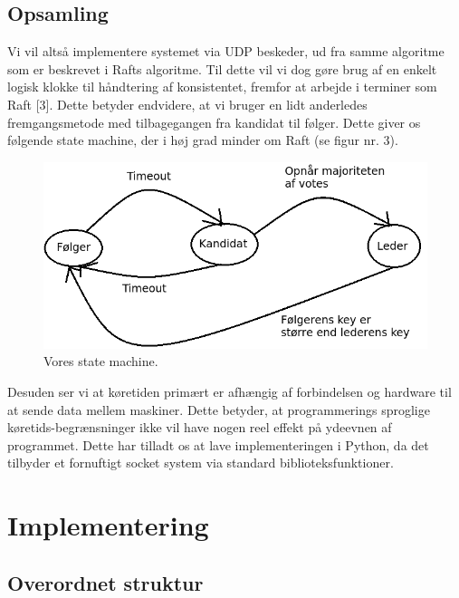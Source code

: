 \documentclass[a4paper,12pt]{article}
\begin{document}
\subsection{Opsamling}
Vi vil altså implementere systemet via UDP beskeder, ud fra samme algoritme som er beskrevet i Rafts algoritme. Til dette vil vi dog gøre brug af en enkelt logisk klokke til håndtering af konsistentet, fremfor at arbejde i terminer som Raft [3]. Dette betyder endvidere, at vi bruger en lidt anderledes fremgangsmetode med tilbagegangen fra kandidat til følger. Dette giver os følgende state machine, der i høj grad minder om Raft (se figur nr. 3).
\begin{figure}[H]
  \caption{Vores state machine.}
  \centering
    \includegraphics[width=1\textwidth]{State-machine.png}
\end{figure}

Desuden ser vi at køretiden primært er afhængig af forbindelsen og hardware til at sende data mellem maskiner. Dette betyder, at programmerings sproglige køretids-begrænsninger ikke vil have nogen reel effekt på ydeevnen af programmet. Dette har tilladt os at lave implementeringen i Python, da det tilbyder et fornuftigt socket system via standard biblioteksfunktioner.
\newpage

\section{Implementering} 
\subsection{Overordnet struktur} 
\end{document}
